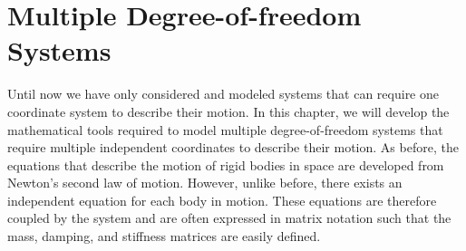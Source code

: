 \documentclass[12pt,letter]{article}
\begin{document}
	
	\setcounter{section}{4}	
	\setcounter{figure}{0}   
	\renewcommand\thefigure{\thesection.\arabic{figure}}
	\setcounter{equation}{0}   
	\renewcommand\theequation{\thesection.\arabic{equation}}
	
		\section{Multiple Degree-of-freedom Systems}
	
	
	
	Until now we have only considered and modeled systems that can require one coordinate system to describe their motion. In this chapter, we will develop the mathematical tools required to model multiple degree-of-freedom systems that require multiple independent coordinates to describe their motion. As before, the equations that describe the motion of rigid bodies in space are developed from Newton's second law of motion. However, unlike before, there exists an independent equation for each body in motion. These equations are therefore coupled by the system and are often expressed in matrix notation such that the mass, damping, and stiffness matrices are easily defined. 
	
	
	
\end{document}
